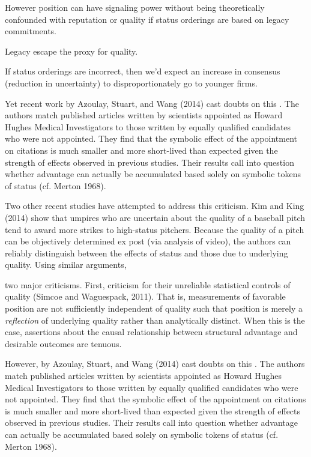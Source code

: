However position can have signaling power without being theoretically confounded with reputation or quality if status orderings are based on legacy commitments.

Legacy escape the proxy for quality.

If status orderings are incorrect, then we'd expect an increase in consensus (reduction in uncertainty) to disproportionately go to younger firms.


Yet
recent work by Azoulay, Stuart, and Wang (2014) cast doubts on this . The authors match published articles written by scientists appointed as Howard Hughes Medical Investigators to those written by equally qualified candidates who were not appointed. They find that the symbolic effect of the appointment on citations is much smaller and more short-lived than expected given the strength of effects observed in previous studies. Their results call into question whether advantage can actually be accumulated based solely on symbolic tokens of status (cf. Merton 1968).


 Two other recent studies have attempted to address this criticism. Kim and King (2014) show that umpires who are uncertain about the quality of a baseball pitch tend to award more strikes to high-status pitchers. Because the quality of a pitch can be objectively determined ex post (via analysis of video), the authors can reliably distinguish between the effects of status and those due to underlying quality. Using similar arguments, 

two major criticisms. First, criticism for their unreliable statistical controls of quality (Simcoe and Waguespack, 2011). That is, measurements of favorable position are not sufficiently independent of quality such that position is merely a {\it reflection} of underlying quality rather than analytically distinct. When this is the case, assertions about the causal relationship between structural advantage and desirable outcomes are tenuous. 



However, by Azoulay, Stuart, and Wang (2014) cast doubts on this . The authors match published articles written by scientists appointed as Howard Hughes Medical Investigators to those written by equally qualified candidates who were not appointed. They find that the symbolic effect of the appointment on citations is much smaller and more short-lived than expected given the strength of effects observed in previous studies. Their results call into question whether advantage can actually be accumulated based solely on symbolic tokens of status (cf. Merton 1968).

